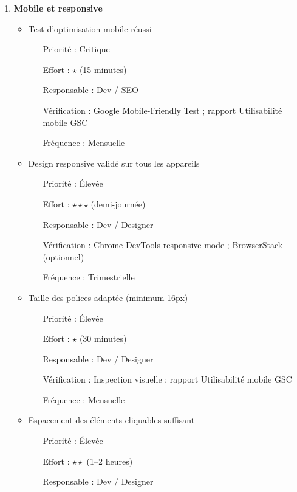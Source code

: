 \documentclass[12pt,a4paper,twoside]{report}
\begin{document}
\begin{enumerate}
    \item \textbf{Mobile et responsive}
    \begin{itemize}
        \item Test d'optimisation mobile réussi
        \begin{itemize}
            \item[Priorité :] Critique
            \item[Effort :] $\star$ (15 minutes)
            \item[Responsable :] Dev / SEO
            \item[Vérification :] Google Mobile-Friendly Test ; rapport Utilisabilité mobile GSC
            \item[Fréquence :] Mensuelle
        \end{itemize}
        \item Design responsive validé sur tous les appareils
        \begin{itemize}
            \item[Priorité :] Élevée
            \item[Effort :] $\star\star\star$ (demi-journée)
            \item[Responsable :] Dev / Designer
            \item[Vérification :] Chrome DevTools responsive mode ; BrowserStack (optionnel)
            \item[Fréquence :] Trimestrielle
        \end{itemize}
        \item Taille des polices adaptée (minimum 16px)
        \begin{itemize}
            \item[Priorité :] Élevée
            \item[Effort :] $\star$ (30 minutes)
            \item[Responsable :] Dev / Designer
            \item[Vérification :] Inspection visuelle ; rapport Utilisabilité mobile GSC
            \item[Fréquence :] Mensuelle
        \end{itemize}
        \item Espacement des éléments cliquables suffisant
        \begin{itemize}
            \item[Priorité :] Élevée
            \item[Effort :] $\star\star$ (1--2 heures)
            \item[Responsable :] Dev / Designer

\end{itemize}
\end{itemize}
\end{enumerate}
\end{document}
